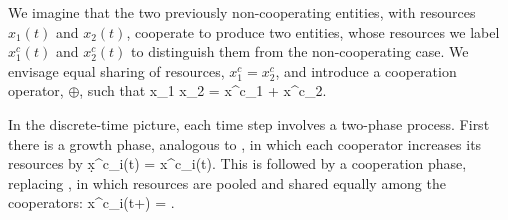 We imagine that the two previously non-cooperating entities, with resources $x_1(t)$ and $x_2(t)$, cooperate to produce two entities, whose resources we label $x^c_1(t)$ and $x^c_2(t)$ to distinguish them from the non-cooperating case. We envisage equal sharing of resources, $x^c_1=x^c_2$, and introduce a cooperation operator, $\oplus$, such that
 \be
 x_1 \oplus x_2 = x^c_1 + x^c_2.
 \ee
 
 In the discrete-time picture, each time step involves a two-phase process. First there is a growth phase, analogous to , in which each cooperator increases its resources by
 \be
 \d x^c_i(t) = x^c_i(t).
 \ee
 This is followed by a cooperation phase, replacing , in which resources are pooled and shared equally among the cooperators:
 \be
 x^c_i(t+\dt) = .
 \ee
 
